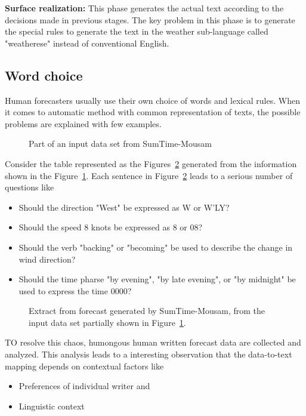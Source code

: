\documentclass{bmcart}
\begin{document}
{\bf Surface realization:} This phase generates the actual text according to the decisions made in previous stages. The key problem in this phase is to generate the special rules to generate the text in the weather sub-language called "weatherese" instead of conventional English. 

\subsection{Word choice}
\label{ssec:wordChoice}

Human forecasters usually use their own choice of words and lexical rules. When it comes to automatic method with common representation of texts, the possible problems are explained with  few examples. 

\begin{figure}[h!tb]
\centering
{}
\caption{Part of an input data set from SumTime-Mousam}
\label{fig:weatherData}
\end{figure}

Consider the table represented as the Figures~\ref{fig:weatherReport} generated from the information shown in the Figure~\ref{fig:weatherData}. Each sentence in Figure~\ref{fig:weatherReport} leads to a serious number of questions like 
\begin{itemize}
\item Should the direction "West" be expressed as W or W’LY?
\item Should the speed 8 knots be expressed as 8 or 08?
\item Should the verb "backing" or "becoming" be used to describe the change in wind direction?
\item Should the time pharse "by evening", "by late evening", or "by midnight" be used to express the
time 0000?
\end{itemize}  

\begin{figure}[h!tb]
\centering
{}
\caption{Extract from forecast generated by SumTime-Mousam, from the input data set partially shown in Figure~\ref{fig:weatherData}. }
\label{fig:weatherReport}
\end{figure}

TO resolve this chaos, humongous human written forecast data are collected and analyzed. This analysis leads to a interesting observation that the data-to-text mapping depends on contextual factors like
\begin{itemize}
\item Preferences of individual writer and 
\item Linguistic context
\end{itemize}
\end{document}
